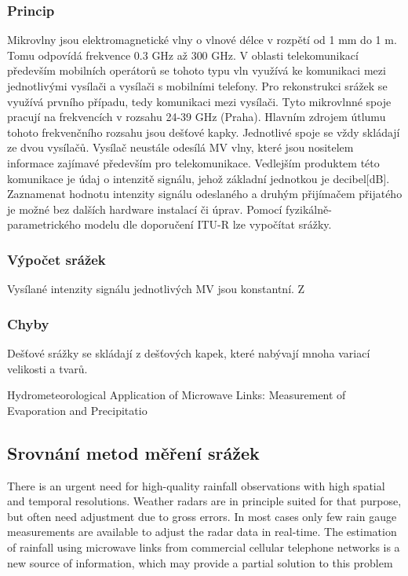\documentclass[a4paper,12pt]{article}
\begin{document}
\subsubsection{Princip}
Mikrovlny jsou elektromagnetické vlny o vlnové délce v rozpětí  od 1 mm do 1 m. Tomu odpovídá frekvence 0.3 GHz až 300 GHz. V oblasti telekomunikací především mobilních operátorů se tohoto typu vln využívá ke komunikaci mezi jednotlivými vysílači a vysílači s mobilními telefony. Pro rekonstrukci srážek se využívá prvního případu, tedy komunikaci mezi vysílači. Tyto mikrovlnné spoje pracují na frekvencích v rozsahu 24-39 GHz (Praha). Hlavním zdrojem útlumu tohoto frekvenčního rozsahu jsou dešťové kapky. Jednotlivé spoje se vždy skládají ze dvou vysílačů. Vysílač neustále odesílá MV vlny, které jsou nositelem informace zajímavé především pro telekomunikace. Vedlejším produktem této komunikace je údaj o intenzitě signálu, jehož základní jednotkou je decibel[dB]. Zaznamenat hodnotu intenzity signálu odeslaného a druhým přijímačem přijatého je možné bez dalších hardware instalací či úprav. Pomocí fyzikálně-parametrického modelu dle doporučení ITU-R\cite{itu} lze vypočítat srážky.

\subsubsection{Výpočet srážek}
Vysílané intenzity signálu jednotlivých MV jsou konstantní. Z
\subsubsection{Chyby}

Dešťové srážky se skládají z dešťových kapek, které nabývají mnoha variací velikosti a tvarů. 




Hydrometeorological Application of Microwave Links: Measurement of Evaporation 
and Precipitatio
\subsection{Srovnání metod měření srážek}


There is an urgent need for high-quality rainfall observations with high spatial and temporal resolutions. Weather radars are 
in principle suited for that purpose, but often need adjustment due to gross errors. In most cases only few rain gauge 
measurements are available to adjust the radar data in real-time. The estimation of rainfall using microwave links from 
commercial cellular telephone networks is a new source of information, which may provide a partial solution to this problem
\end{document}
